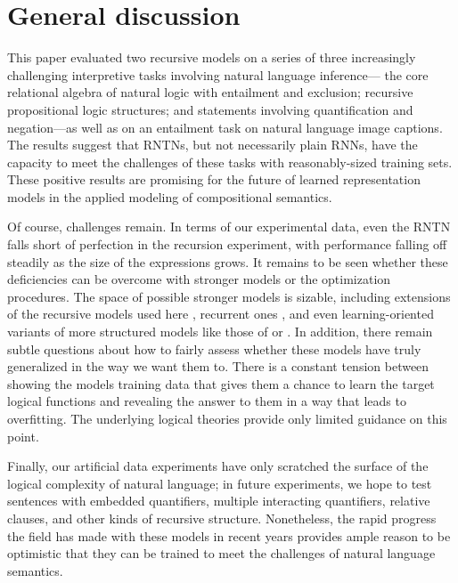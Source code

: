 \section{General discussion}\label{sec:discussion}

This paper evaluated two recursive models on a series of three increasingly
challenging interpretive tasks involving natural language inference---
the core relational algebra of natural logic with entailment and
exclusion; recursive propositional logic structures; and statements
involving quantification and negation---as well as on an entailment task on
natural language image captions. The results suggest that RNTNs,
but not necessarily plain RNNs, have the capacity to meet the 
challenges of these tasks with reasonably-sized training sets. These positive results are
promising for the future of learned representation models in the
applied modeling of compositional semantics.

Of course, challenges remain. In terms of our experimental data, even
the RNTN falls short of perfection in the recursion experiment, with
performance falling off steadily as the size of the expressions grows. It
remains to be seen whether these deficiencies can be overcome with
stronger models or the optimization procedures. The space of possible stronger
models is sizable, including extensions of the recursive models used here
\cite{sochergrounded,kalchbrenner2014convolutional,irsoydeep}, recurrent
ones \cite{sutskever2014sequence}, and even learning-oriented variants 
of more structured models like those of  or .
In addition,
there remain subtle questions about how to fairly assess whether these
models have truly generalized in the way we want them to. There is a
constant tension between showing the models training data that gives
them a chance to learn the target logical functions and revealing the
answer to them in a way that leads to overfitting. The underlying
logical theories provide only limited guidance on this point.

Finally, our artificial data experiments have only scratched the surface 
of the logical complexity of natural language; in future experiments, we hope to test sentences
with embedded quantifiers, multiple interacting quantifiers, relative
clauses, and other kinds of recursive structure. Nonetheless, the
rapid progress the field has made with these models in recent years
provides ample reason to be optimistic that they can be trained to
meet the challenges of natural language semantics.

